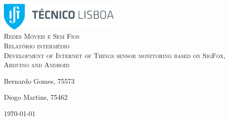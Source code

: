 \begin{titlepage}

	\begin{center}

		\includegraphics[width=6cm]{./title}\\[3cm]

		\textsc{\LARGE Redes Móveis e Sem Fios}\\[1.5cm]

		\textsc{\Large Relatório intermédio  }\\[1.5cm]
		
		
		\textsc{Development of Internet of Things sensor monitoring based on SigFox, Arduino and Android }\\[1.5cm]
		



		


		\noindent
		\begin{minipage}{0.4\textwidth}
			\begin{flushleft} \large
				Bernardo Gomes, 75573
			\end{flushleft}
		\end{minipage}
		\begin{minipage}{0.4\textwidth}
			\begin{flushright} \large
				Diogo Martins, 75462
			\end{flushright}
		\end{minipage}

		\vfill

		{\large \today}


	\end{center}

\end{titlepage}